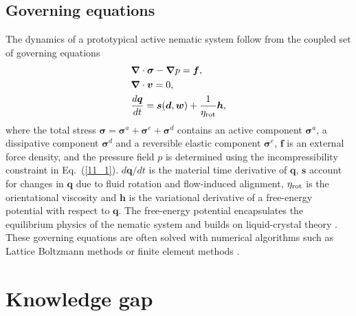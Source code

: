 \subsection{Governing equations}
The dynamics of a prototypical active nematic system follow from the coupled set of  governing equations
\begin{align}
	& \bm{\nabla} \cdot \bm{\sigma} - \bm{\nabla} p = \bm{f},   \label{12_1} \\ &
	\bm{\nabla} \cdot \bm{v} = 0 , \label{11_1}  \\ &
	\frac{d\bm{q}}{dt}  = \bm{s}(\bm{d},\bm{w}) + \frac{1}{\eta_{\rm  rot}}\bm{h},  
\end{align}
where the total stress $\bm{\sigma} = \bm{\sigma}^a + \bm{\sigma}^e + \bm{\sigma}^d$ contains an active component $\bm{\sigma}^a$, a dissipative component $\bm{\sigma}^d$ and a reversible elastic component $\bm{\sigma}^e$,  $\bm{f}$ is an external force density, and the pressure field $p$ is determined using the incompressibility constraint in Eq.~(\ref{11_1}). $d\bm{q}/dt$ is the material time derivative of $\bm{q}$, $\bm{s}$ account for changes in $\bm{q}$ due to fluid rotation and flow-induced alignment, $\eta_{\rm rot}$ is the orientational viscosity and $\bm{h}$ is the variational derivative of a free-energy potential with respect to $\bm{q}$. The free-energy potential encapsulates the equilibrium physics of the nematic system and builds on liquid-crystal theory \cite{de1993,edwards1990,beris1994}.   These governing equations are often solved with numerical algorithms such as Lattice Boltzmann methods \cite{desplat2001, denniston2004,marenduzzo2007,cates2009} or finite element methods \cite{goudiaby2021,becker2008, norton2018}.

\section{Knowledge gap}

